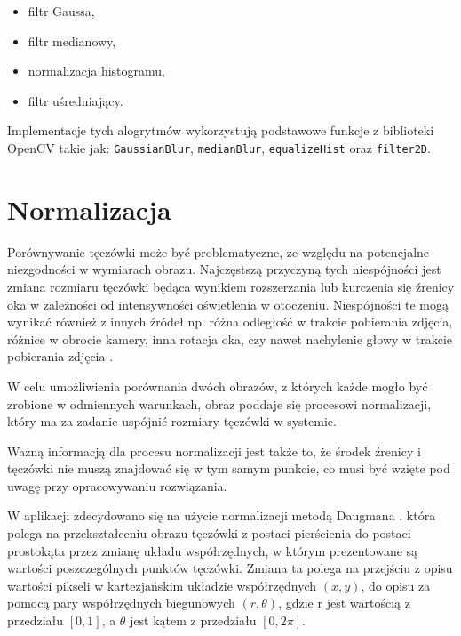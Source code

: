 \documentclass[10pt,polish,a4paper,oneside]{ppfcmthesis}
\begin{document}
\begin{itemize}
  \item filtr Gaussa,
  \item filtr medianowy,
  \item normalizacja histogramu,
  \item filtr uśredniający.
\end{itemize}

Implementacje tych alogrytmów wykorzystują podstawowe funkcje z biblioteki OpenCV takie jak:
\verb|GaussianBlur|, \verb|medianBlur|, \verb|equalizeHist| oraz \verb|filter2D|.

\section{Normalizacja}

Porównywanie tęczówki może by\'c problematyczne, ze względu na potencjalne niezgodności w
wymiarach obrazu. Najczęstszą przyczyną tych niespójności jest zmiana rozmiaru tęczówki
będąca wynikiem rozszerzania lub kurczenia się  \'zrenicy oka w zależności od intensywności
oświetlenia w otoczeniu. Niespójności te mogą wynika\'c również z innych \'zródeł np. różna
odległoś\'c w trakcie pobierania zdjęcia, różnice w obrocie kamery, inna rotacja oka, czy
nawet nachylenie głowy w trakcie pobierania zdjęcia \cite{DaugmanHowIrisRecognitionWorks}.\newline

W celu umożliwienia porównania dwóch obrazów, z których każde mogło by\'c zrobione w odmiennych
warunkach, obraz poddaje się procesowi normalizacji, który ma za zadanie uspójni\'c rozmiary
tęczówki w systemie.

\noindent
Ważną informacją dla procesu normalizacji jest także to, że środek \'zrenicy i tęczówki nie
muszą znajdowa\'c się w tym samym punkcie, co musi by\'c wzięte pod uwagę przy opracowywaniu
rozwiązania.\newline

W aplikacji zdecydowano się na użycie normalizacji metodą Daugmana \cite{DaugmanHowIrisRecognitionWorks}, która polega na przekształceniu
obrazu tęczówki z postaci pierścienia do postaci prostokąta przez zmianę układu współrzędnych, w którym
prezentowane są wartości poszczególnych punktów tęczówki. Zmiana ta polega na przejściu z opisu
wartości pikseli w kartezjańskim układzie współrzędnych $(x,y)$, do opisu za pomocą pary
współrzędnych biegunowych $(r, \theta)$, gdzie r jest wartością z przedziału $[0,1]$, a $\theta$ jest kątem
z przedziału $[0, 2\pi]$.\newline
\end{document}

